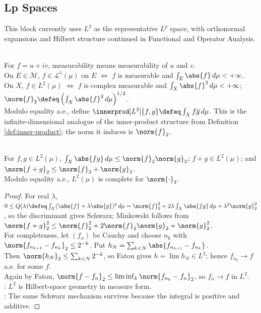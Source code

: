 \subsection{Lp Spaces}

%

This block currently uses $L^2$ as the representative $L^p$ space, with orthonormal expansions and Hilbert structure continued in Functional and Operator Analysis.

\begin{definition} \label{def:complex-integrable-and-l2} \\
For $f=u+iv$, measurability means measurability of $u$ and $v$.\\
On $E\in\mathcal{M}$, $f\in\mathscr{L}^1(\mu)$ on $E$ $\iff$ $f$ is measurable and $\int_E\abs{f}\,d\mu<+\infty$.\\
On $X$, $f\in L^2(\mu)$ $\iff$ $f$ is complex measurable and $\int_X\abs{f}^2\,d\mu<+\infty$; $\norm{f}_2\defeq\left(\int_X\abs{f}^2\,d\mu\right)^{1/2}$.\\
Modulo equality a.e., define $\innerprod[L^2]{f,g}\defeq\int_X f\overline{g}\,d\mu$. This is the infinite-dimensional analogue of the inner-product structure from Definition \ref{def:inner-product}; the norm it induces is $\norm{f}_2$.
\end{definition}

\begin{theorem} \label{thm:l2-schwarz-minkowski-and-completeness} \\
For $f,g\in L^2(\mu)$, $\int_X\abs{fg}\,d\mu\leq\norm{f}_2\norm{g}_2$; $f+g\in L^2(\mu)$; and $\norm{f+g}_2\leq\norm{f}_2+\norm{g}_2$.\\
Modulo equality a.e., $L^2(\mu)$ is complete for $\norm{\cdot}_2$.
\begin{proof}
For real $\lambda$, $0\leq Q(\lambda)\defeq\int_X(\abs{f}+\lambda\abs{g})^2\,d\mu =\norm{f}_2^2+2\lambda\int_X\abs{fg}\,d\mu+\lambda^2\norm{g}_2^2$, so the discriminant gives Schwarz; Minkowski follows from $\norm{f+g}_2^2\leq\norm{f}_2^2+2\norm{f}_2\norm{g}_2+\norm{g}_2^2$.\\
For completeness, let $(f_n)$ be Cauchy and choose $n_k$ with $\norm{f_{n_{k+1}}-f_{n_k}}_2\leq2^{-k}$. Put $h_N=\sum_{k<N}\abs{f_{n_{k+1}}-f_{n_k}}$.\\
Then $\norm{h_N}_2\leq\sum_{k<N}2^{-k}$, so Fatou gives $h=\lim h_N\in L^2$; hence $f_{n_k}\to f$ a.e. for some $f$.\\
Again by Fatou, $\norm{f-f_n}_2\leq\liminf_k\norm{f_{n_k}-f_n}_2$, so $f_n\to f$ in $L^2$.\\
: $L^2$ is Hilbert-space geometry in measure form.\\
: The same Schwarz mechanism survives because the integral is positive and additive.
\end{proof}
\end{theorem}

